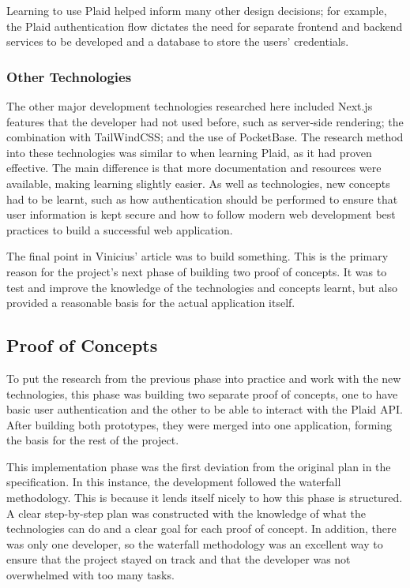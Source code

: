 Learning to use Plaid helped inform many other design decisions; for example, the Plaid authentication flow dictates the need for separate frontend and backend services to be developed and a database to store the users' credentials.

\subsubsection{Other Technologies}
The other major development technologies researched here included Next.js features that the developer had not used before, such as server-side rendering; the combination with TailWindCSS; and the use of PocketBase. The research method into these technologies was similar to when learning Plaid, as it had proven effective. The main difference is that more documentation and resources were available, making learning slightly easier. As well as technologies, new concepts had to be learnt, such as how authentication should be performed to ensure that user information is kept secure and how to follow modern web development best practices to build a successful web application.

The final point in Vinicius' article was to build something. This is the primary reason for the project's next phase of building two proof of concepts. It was to test and improve the knowledge of the technologies and concepts learnt, but also provided a reasonable basis for the actual application itself.

\subsection{Proof of Concepts}
To put the research from the previous phase into practice and work with the new technologies, this phase was building two separate proof of concepts, one to have basic user authentication and the other to be able to interact with the Plaid API. After building both prototypes, they were merged into one application, forming the basis for the rest of the project.

This implementation phase was the first deviation from the original plan in the specification. In this instance, the development followed the waterfall methodology. This is because it lends itself nicely to how this phase is structured. A clear step-by-step plan was constructed with the knowledge of what the technologies can do and a clear goal for each proof of concept. In addition, there was only one developer, so the waterfall methodology was an excellent way to ensure that the project stayed on track and that the developer was not overwhelmed with too many tasks.

